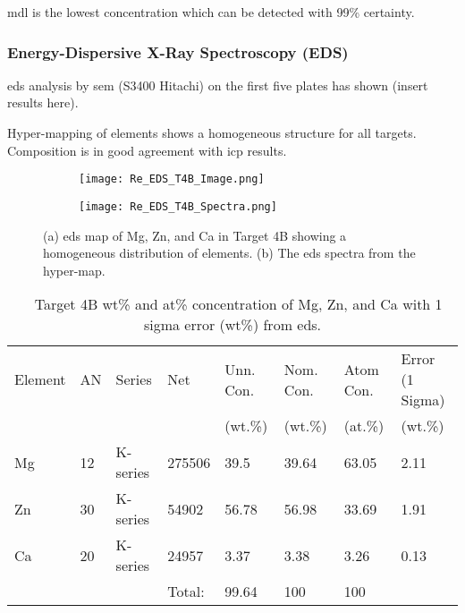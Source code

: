 \documentclass[a4paper,12pt,oneside]{report}%
\begin{document}
\Gls{mdl} is the lowest concentration which can be detected with 99\% certainty.

\subsubsection{Energy-Dispersive X-Ray Spectroscopy (EDS)}
\Gls{eds} analysis by \gls{sem} (S3400 Hitachi) on the first five plates has shown (insert results here). 

Hyper-mapping of elements shows a homogeneous structure for all targets. Composition is in good agreement with \gls{icp} results.

\begin{figure}[htbp]
	\centering
	\begin{subfigure}[htbp]{0.49\textwidth}
		\texttt{[image: Re\_EDS\_T4B\_Image.png]}
		\caption{}
		\label{fig:EDST4A_Micro}
	\end{subfigure}
	\begin{subfigure}[htbp]{0.49\textwidth}
		\texttt{[image: Re\_EDS\_T4B\_Spectra.png]}
		\caption{}
		\label{fig:EDST4A_Spectra}
	\end{subfigure}
	\caption{(a) \acrshort{eds} map of Mg, Zn, and Ca in Target 4B showing a homogeneous distribution of elements. (b) The \acrshort{eds} spectra from the hyper-map.}%
	\label{fig:EDST4A}
\end{figure}

\begin{table}[H]
	\centering
	\begin{tabular}{llllllll}
		\toprule
		Element & AN & Series & Net & Unn. Con. & Nom. Con. & Atom Con. & Error (1 Sigma)\\
		& & & & (wt.\%) & (wt.\%) & (at.\%) & (wt.\%) \\
		\midrule
		Mg & 12 & K-series & 275506 & 39.5 & 39.64 & 63.05 & 2.11 \\
		Zn & 30 & K-series & 54902  & 56.78  & 56.98  & 33.69 & 1.91  \\
		Ca & 20 & K-series & 24957  & 3.37 & 3.38  & 3.26 & 0.13  \\
		\midrule
		&  &    & Total:   & 99.64 & 100  & 100  & \\
		\bottomrule                
	\end{tabular}
	\caption{\MgZnCa~ Target 4B wt\% and at\% concentration of Mg, Zn, and Ca with 1 sigma error (wt\%) from \acrshort{eds}.}
	\label{tab:EDST4Tabel}
\end{table}
\end{document}
